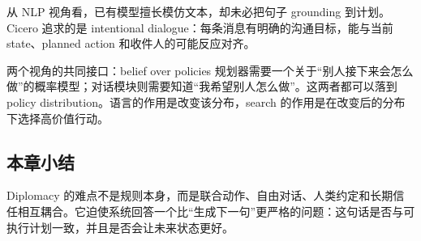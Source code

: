 
从 NLP 视角看，已有模型擅长模仿文本，却未必把句子 grounding 到计划。Cicero 追求的是 intentional dialogue：每条消息有明确的沟通目标，能与当前 state、planned action 和收件人的可能反应对齐。


\begin{knowledgebox}{两个视角的共同接口：belief over policies}
规划器需要一个关于“别人接下来会怎么做”的概率模型；对话模块则需要知道“我希望别人怎么做”。这两者都可以落到 policy distribution。语言的作用是改变该分布，search 的作用是在改变后的分布下选择高价值行动。
\end{knowledgebox}

\subsection{本章小结}

Diplomacy 的难点不是规则本身，而是联合动作、自由对话、人类约定和长期信任相互耦合。它迫使系统回答一个比“生成下一句”更严格的问题：这句话是否与可执行计划一致，并且是否会让未来状态更好。

